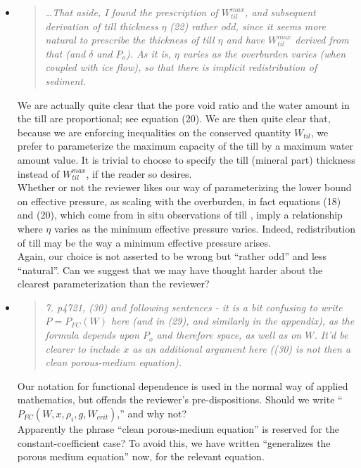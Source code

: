 \documentclass[11pt,reqno]{amsart}
\newcommand{\reply}[2]{
\medskip\medskip
\item  \begin{quote}
\emph{#1}
\end{quote}

\medskip
\noindent #2}
\begin{document}
\begin{itemize}
\reply{\dots That aside, I found the prescription of $W_{til}^{max}$, and subsequent derivation of till thickness $\eta$ (22) rather odd, since it seems more natural to prescribe the thickness of till $\eta$ and have $W_{til}^{max}$ derived from that (and $\delta$ and $P_o$).  As it is, $\eta$ varies as the overburden varies (when coupled with ice flow), so that there is implicit redistribution of sediment.}
{We are actually quite clear that the pore void ratio and the water amount in the till are proportional; see equation (20).  We are then quite clear that, because we are enforcing inequalities on the conserved quantity $W_{til}$, we prefer to parameterize the maximum capacity of the till by a maximum water amount value.  It is trivial to choose to specify the till (mineral part) thickness instead of $W_{til}^{max}$, if the reader so desires. \\
\indent Whether or not the reviewer likes our way of parameterizing the lower bound on effective pressure, as scaling with the overburden, in fact equations (18) and (20), which come from in situ observations of till \cite{Tulaczyketal2000}, imply a relationship where $\eta$ varies as the minimum effective pressure varies.  Indeed, redistribution of till may be the way a minimum effective pressure arises. \\
\indent Again, our choice is not asserted to be wrong but ``rather odd'' and  less ``natural''.  Can we suggest that we may have thought harder about the clearest parameterization than the reviewer?}

\reply{7. p4721, (30) and following sentences - it is a bit confusing to write $P = P_{FC}(W)$ here (and in (29), and similarly in the appendix), as the formula depends upon $P_o$ and therefore space, as well as on $W$.  It'd be clearer to include $x$ as an additional argument here ((30) is not then a clean porous-medium equation).}
{Our notation for functional dependence is used in the normal way of applied mathematics, but offends the reviewer's pre-dispositions.  Should we write ``$P_{FC}(W,x,\rho_i,g,W_{crit})$,'' and why not?\\
\indent  Apparently the phrase ``clean porous-medium equation'' is reserved for the constant-coefficient case?  To avoid this, we have written ``generalizes the porous medium equation'' now, for the relevant equation.}


\end{itemize}
\end{document}
